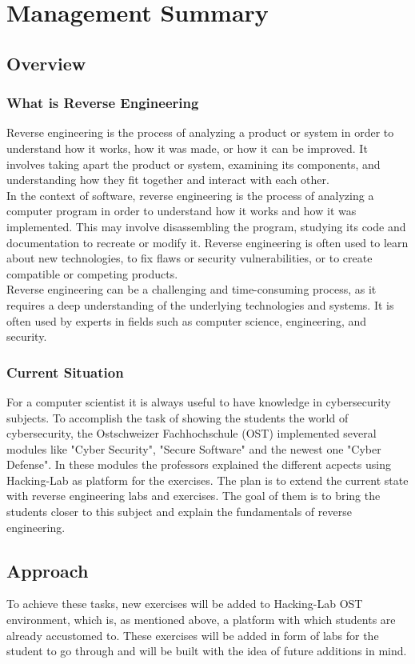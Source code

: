 \chapter{Management Summary}
\section{Overview}
\subsection{What is Reverse Engineering}
Reverse engineering is the process of analyzing a product or system in order to understand how it works, how it was made, or how it can be improved. It involves taking apart the product or system, examining its components, and understanding how they fit together and interact with each other. \\
In the context of software, reverse engineering is the process of analyzing a computer program in order to understand how it works and how it was implemented. This may involve disassembling the program, studying its code and documentation to recreate or modify it. Reverse engineering is often used to learn about new technologies, to fix flaws or security vulnerabilities, or to create compatible or competing products. \\
Reverse engineering can be a challenging and time-consuming process, as it requires a deep understanding of the underlying technologies and systems. It is often used by experts in fields such as computer science, engineering, and security. 

\subsection{Current Situation}
For a computer scientist it is always useful to have knowledge in cybersecurity subjects. To accomplish the task of showing the students the world of cybersecurity, the Ostschweizer Fachhochschule (OST) implemented several modules like "Cyber Security", "Secure Software" and the newest one "Cyber Defense". In these modules the professors explained the different acpects using Hacking-Lab as platform for the exercises. The plan is to extend the current state with reverse engineering labs and exercises. The goal of them is to bring the students closer to this subject and explain the fundamentals of reverse engineering.

\section{Approach}
To achieve these tasks, new exercises will be added to Hacking-Lab OST environment, which is, as mentioned above, a platform with which students are already accustomed to. These exercises will be added in form of labs for the student to go through and will be built with the idea of future additions in mind.

